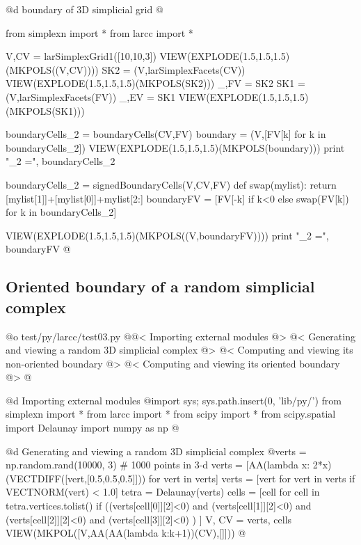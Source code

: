 \documentclass[11pt,oneside]{article}	%
\begin{document}
@d boundary of 3D simplicial grid
@{from simplexn import *
from larcc import *

V,CV = larSimplexGrid1([10,10,3])
VIEW(EXPLODE(1.5,1.5,1.5)(MKPOLS((V,CV))))
SK2 = (V,larSimplexFacets(CV))
VIEW(EXPLODE(1.5,1.5,1.5)(MKPOLS(SK2)))
_,FV = SK2
SK1 = (V,larSimplexFacets(FV))
_,EV = SK1
VIEW(EXPLODE(1.5,1.5,1.5)(MKPOLS(SK1)))

boundaryCells_2 = boundaryCells(CV,FV)
boundary = (V,[FV[k] for k in boundaryCells_2])
VIEW(EXPLODE(1.5,1.5,1.5)(MKPOLS(boundary)))
print "\nboundaryCells_2 =\n", boundaryCells_2

boundaryCells_2 = signedBoundaryCells(V,CV,FV)
def swap(mylist): return [mylist[1]]+[mylist[0]]+mylist[2:]
boundaryFV = [FV[-k] if k<0 else swap(FV[k]) for k in boundaryCells_2]

VIEW(EXPLODE(1.5,1.5,1.5)(MKPOLS((V,boundaryFV))))
print "\nboundaryCells_2 =\n", boundaryFV
@}


\subsection{Oriented boundary of a random simplicial complex}


@o test/py/larcc/test03.py
@{@< Importing external modules @>
@< Generating and viewing a random 3D simplicial complex @>
@< Computing and viewing its non-oriented boundary @>
@< Computing and viewing its oriented boundary @>
@}


@d Importing external modules
@{import sys; sys.path.insert(0, 'lib/py/')
from simplexn import *
from larcc import *
from scipy import *
from scipy.spatial import Delaunay
import numpy as np
@}

@d Generating and viewing a random 3D simplicial complex
@{verts = np.random.rand(10000, 3) # 1000 points in 3-d
verts = [AA(lambda x: 2*x)(VECTDIFF([vert,[0.5,0.5,0.5]])) for vert in verts]
verts = [vert for vert in verts if VECTNORM(vert) < 1.0]
tetra = Delaunay(verts)
cells = [cell for cell in tetra.vertices.tolist()
         if  ((verts[cell[0]][2]<0) and (verts[cell[1]][2]<0) 
         		and (verts[cell[2]][2]<0) and (verts[cell[3]][2]<0) ) ]
V, CV = verts, cells
VIEW(MKPOL([V,AA(AA(lambda k:k+1))(CV),[]]))
@}
\end{document}
